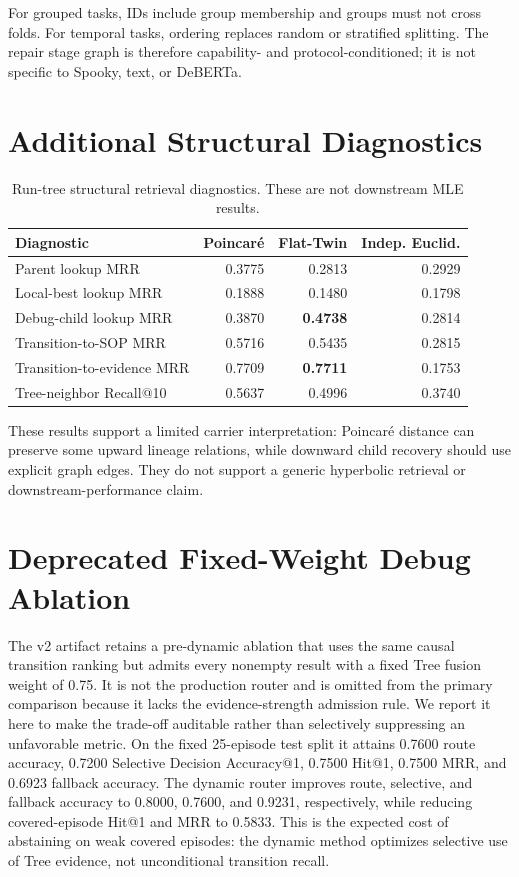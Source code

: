 \documentclass{article}
\begin{document}
For grouped tasks, IDs include group membership and groups must not cross folds.
For temporal tasks, ordering replaces random or stratified splitting.  The
repair stage graph is therefore capability- and protocol-conditioned; it is not
specific to Spooky, text, or DeBERTa.

\section{Additional Structural Diagnostics}

\begin{table}[h]
\caption{Run-tree structural retrieval diagnostics.  These are not downstream
MLE results.}
\centering
\small
\begin{tabular}{lrrr}
\toprule
Diagnostic & Poincar\'e & Flat-Twin & Indep. Euclid. \\
\midrule
Parent lookup MRR & 0.3775 & 0.2813 & 0.2929 \\
Local-best lookup MRR & 0.1888 & 0.1480 & 0.1798 \\
Debug-child lookup MRR & 0.3870 & \textbf{0.4738} & 0.2814 \\
Transition-to-SOP MRR & 0.5716 & 0.5435 & 0.2815 \\
Transition-to-evidence MRR & 0.7709 & \textbf{0.7711} & 0.1753 \\
Tree-neighbor Recall@10 & 0.5637 & 0.4996 & 0.3740 \\
\bottomrule
\end{tabular}
\end{table}
\FloatBarrier

These results support a limited carrier interpretation: Poincar\'e distance can
preserve some upward lineage relations, while downward child recovery should use
explicit graph edges.  They do not support a generic hyperbolic retrieval or
downstream-performance claim.

\section{Deprecated Fixed-Weight Debug Ablation}

The v2 artifact retains a pre-dynamic ablation that uses the same causal
transition ranking but admits every nonempty result with a fixed Tree fusion
weight of 0.75.  It is not the production router and is omitted from the primary
comparison because it lacks the evidence-strength admission rule.  We report it
here to make the trade-off auditable rather than selectively suppressing an
unfavorable metric.  On the fixed 25-episode test split it attains 0.7600 route
accuracy, 0.7200 Selective Decision Accuracy@1, 0.7500 Hit@1, 0.7500 MRR, and
0.6923 fallback accuracy.  The dynamic router improves route, selective, and
fallback accuracy to 0.8000, 0.7600, and 0.9231, respectively, while reducing
covered-episode Hit@1 and MRR to 0.5833.  This is the expected cost of abstaining
on weak covered episodes: the dynamic method optimizes selective use of Tree
evidence, not unconditional transition recall.
\end{document}
